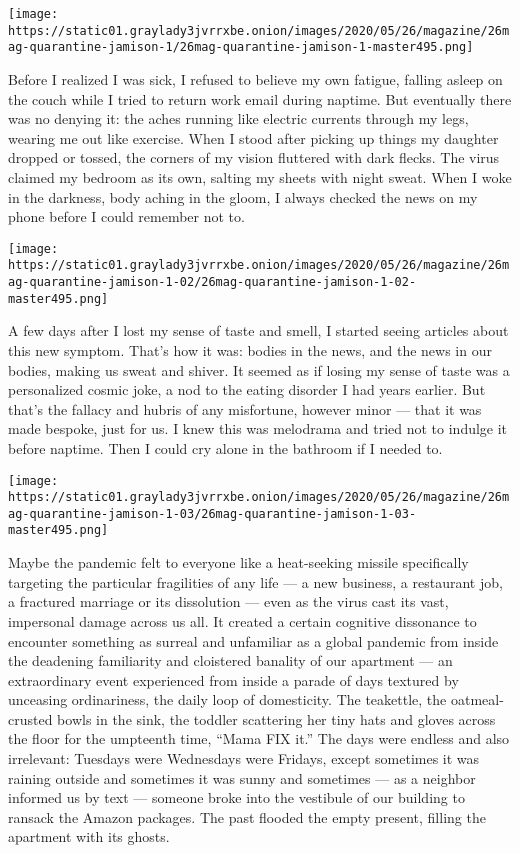 \texttt{[image: https://static01.graylady3jvrrxbe.onion/images/2020/05/26/magazine/26mag-quarantine-jamison-1/26mag-quarantine-jamison-1-master495.png]}

Before I realized I was sick, I refused to believe my own fatigue,
falling asleep on the couch while I tried to return work email during
naptime. But eventually there was no denying it: the aches running like
electric currents through my legs, wearing me out like exercise. When I
stood after picking up things my daughter dropped or tossed, the corners
of my vision fluttered with dark flecks. The virus claimed my bedroom as
its own, salting my sheets with night sweat. When I woke in the
darkness, body aching in the gloom, I always checked the news on my
phone before I could remember not to.

\texttt{[image: https://static01.graylady3jvrrxbe.onion/images/2020/05/26/magazine/26mag-quarantine-jamison-1-02/26mag-quarantine-jamison-1-02-master495.png]}

A few days after I lost my sense of taste and smell, I started seeing
articles about this new symptom. That's how it was: bodies in the news,
and the news in our bodies, making us sweat and shiver. It seemed as if
losing my sense of taste was a personalized cosmic joke, a nod to the
eating disorder I had years earlier. But that's the fallacy and hubris
of any misfortune, however minor --- that it was made bespoke, just for
us. I knew this was melodrama and tried not to indulge it before
naptime. Then I could cry alone in the bathroom if I needed to.

\texttt{[image: https://static01.graylady3jvrrxbe.onion/images/2020/05/26/magazine/26mag-quarantine-jamison-1-03/26mag-quarantine-jamison-1-03-master495.png]}

Maybe the pandemic felt to everyone like a heat-seeking missile
specifically targeting the particular fragilities of any life --- a new
business, a restaurant job, a fractured marriage or its dissolution ---
even as the virus cast its vast, impersonal damage across us all. It
created a certain cognitive dissonance to encounter something as surreal
and unfamiliar as a global pandemic from inside the deadening
familiarity and cloistered banality of our apartment --- an
extraordinary event experienced from inside a parade of days textured by
unceasing ordinariness, the daily loop of domesticity. The teakettle,
the oatmeal-crusted bowls in the sink, the toddler scattering her tiny
hats and gloves across the floor for the umpteenth time, ``Mama FIX
it.'' The days were endless and also irrelevant: Tuesdays were
Wednesdays were Fridays, except sometimes it was raining outside and
sometimes it was sunny and sometimes --- as a neighbor informed us by
text --- someone broke into the vestibule of our building to ransack the
Amazon packages. The past flooded the empty present, filling the
apartment with its ghosts.

